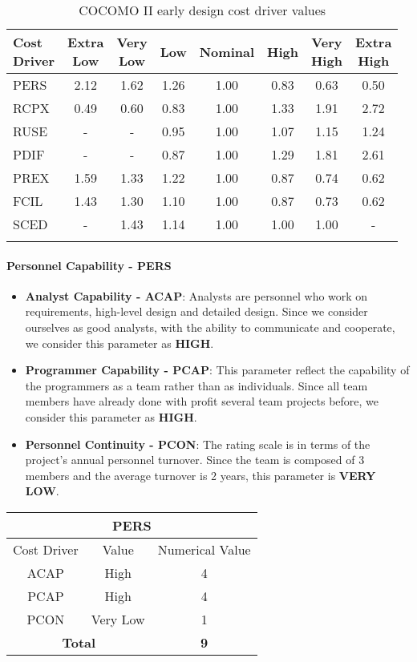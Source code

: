 \begin{longtable}{l|ccccccc}
\toprule
\specialcell{Cost\\Driver}&\specialcell{Extra\\Low}&\specialcell{Very\\Low}&Low&Nominal&High&\specialcell{Very\\High}&\specialcell{Extra\\High}\\
\midrule
PERS &2.12 &1.62 &1.26 &1.00 &0.83 &0.63 &0.50\\
RCPX &0.49 &0.60 &0.83 &1.00 &1.33 &1.91 &2.72\\
RUSE &-	   &-	 &0.95 &1.00 &1.07 &1.15 &1.24\\
PDIF &-	   &-    &0.87 &1.00 &1.29 &1.81 &2.61\\
PREX &1.59 &1.33 &1.22 &1.00 &0.87 &0.74 &0.62\\
FCIL &1.43 &1.30 &1.10 &1.00 &0.87 &0.73 &0.62\\
SCED &-	   &1.43 &1.14 &1.00 &1.00 &1.00 &-\\
\bottomrule
\caption{\label{tbl:costDriverConversionValue}COCOMO II early design cost driver values}
\end{longtable}

\paragraph{Personnel Capability - PERS}
\begin{itemize}
	\item \textbf{Analyst Capability - ACAP}: Analysts are personnel who work on requirements, high-level design and detailed design. Since we consider ourselves as good analysts, with the ability to communicate and cooperate, we consider this parameter as \textbf{HIGH}.
	\item \textbf{Programmer Capability - PCAP}: This parameter reflect the capability of the programmers as a team rather than as individuals. Since all team members have already done with profit several team projects before, we consider this parameter as \textbf{HIGH}.
	\item \textbf{Personnel Continuity - PCON}: The rating scale is in terms of the project’s annual personnel turnover. Since the team is composed of 3 members and the average turnover is 2 years, this parameter is \textbf{VERY LOW}.
\end{itemize}

\begin{longtable}{ccc}
\multicolumn{3}{c}{\textbf{PERS}}\\
\toprule
Cost Driver&Value&Numerical Value\\
\midrule
ACAP&High&4\\
PCAP&High&4\\
PCON&Very Low&1\\
\midrule
\multicolumn{2}{c}{\textbf{Total}}&\textbf{9}\\
\bottomrule
\end{longtable}

